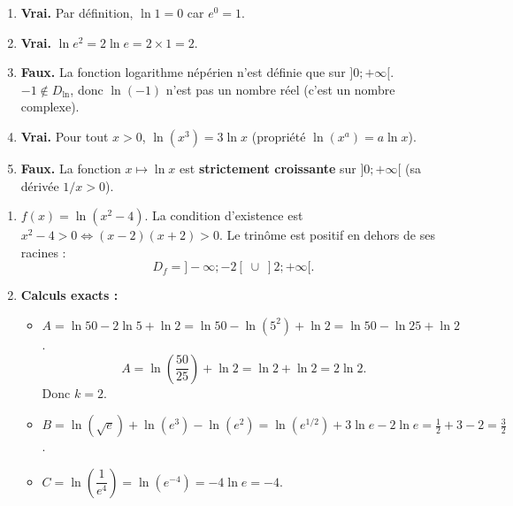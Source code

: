 \documentclass[11pt]{article}
\begin{document}
\begin{corrige}
\begin{enumerate}
    \item \textbf{Vrai.} Par définition, $\ln 1 = 0$ car $e^0 = 1$.
    \item \textbf{Vrai.} $\ln e^2 = 2 \ln e = 2 \times 1 = 2$.
    \item \textbf{Faux.} La fonction logarithme népérien n'est définie que sur $]0;+\infty[$. $-1 \notin D_{\ln}$, donc $\ln(-1)$ n'est pas un nombre réel (c'est un nombre complexe).
    \item \textbf{Vrai.} Pour tout $x>0$, $\ln(x^3) = 3\ln x$ (propriété $\ln(x^a)=a\ln x$).
    \item \textbf{Faux.} La fonction $x \mapsto \ln x$ est \textbf{strictement croissante} sur $]0;+\infty[$ (sa dérivée $1/x > 0$).
\end{enumerate}
\end{corrige}

\begin{corrige}
\begin{enumerate}
    \item $f(x) = \ln(x^2-4)$. La condition d'existence est $x^2-4 > 0 \iff (x-2)(x+2) > 0$.
    Le trinôme est positif en dehors de ses racines :
    \[
    D_f = ]-\infty;-2[ \;\cup\; ]2;+\infty[.
    \]
    \item \textbf{Calculs exacts :}
    \begin{itemize}
        \item $A = \ln 50 - 2\ln 5 + \ln 2 = \ln 50 - \ln(5^2) + \ln 2 = \ln 50 - \ln 25 + \ln 2$.
        \[
        A = \ln\left(\frac{50}{25}\right) + \ln 2 = \ln 2 + \ln 2 = 2\ln 2.
        \]
        Donc $k=2$.
        \item $B = \ln(\sqrt{e}) + \ln(e^3) - \ln(e^2) = \ln(e^{1/2}) + 3\ln e - 2\ln e = \frac{1}{2} + 3 - 2 = \frac{3}{2}$.
        \item $C = \ln\left(\dfrac{1}{e^4}\right) = \ln(e^{-4}) = -4 \ln e = -4$.
    \end{itemize}
\end{enumerate}
\end{corrige}
\end{document}
